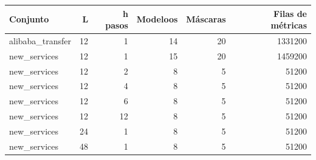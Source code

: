 \begin{tabular}{lrrrrr}
\toprule
Conjunto & L & h pasos & Modeloos & Máscaras & Filas de métricas \\
\midrule
alibaba\_transfer & 12 & 1 & 14 & 20 & 1331200 \\
new\_services & 12 & 1 & 15 & 20 & 1459200 \\
new\_services & 12 & 2 & 8 & 5 & 51200 \\
new\_services & 12 & 4 & 8 & 5 & 51200 \\
new\_services & 12 & 6 & 8 & 5 & 51200 \\
new\_services & 12 & 12 & 8 & 5 & 51200 \\
new\_services & 24 & 1 & 8 & 5 & 51200 \\
new\_services & 48 & 1 & 8 & 5 & 51200 \\
\bottomrule
\end{tabular}
